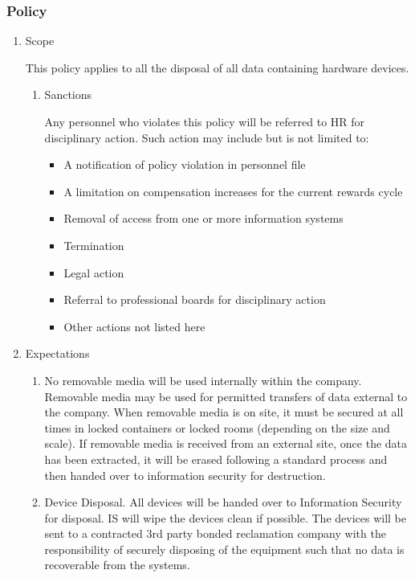 \documentclass[stu]{apa7}
\begin{document}
\subsubsection{Policy}
\label{sec:orgda9769f}

\begin{enumerate}
\item Scope
\label{sec:orgd6cd207}

This policy applies to all the disposal of all data containing hardware devices.

\begin{enumerate}
\item Sanctions
\label{sec:orge4e3a17}

Any personnel who violates this policy will be referred to HR for disciplinary action. Such action may include but is not limited to:

\begin{itemize}
\item A notification of policy violation in personnel file
\item A limitation on compensation increases for the current rewards cycle
\item Removal of access from one or more information systems
\item Termination
\item Legal action
\item Referral to professional boards for disciplinary action
\item Other actions not listed here
\end{itemize}
\end{enumerate}


\item Expectations
\label{sec:org21272c0}

\begin{enumerate}
\item No removable media will be used internally within the company. Removable media may be used for permitted transfers of data external to the company. When removable media is on site, it must be secured at all times in locked containers or locked rooms (depending on the size and scale). If removable media is received from an external site, once the data has been extracted, it will be erased following a standard process and then handed over to information security for destruction.
\item Device Disposal. All devices will be handed over to Information Security for disposal. IS will wipe the devices clean if possible. The devices will be sent to a contracted 3rd party bonded reclamation company with the responsibility of securely disposing of the equipment such that no data is recoverable from the systems.
\end{enumerate}


\end{enumerate}
\end{document}
